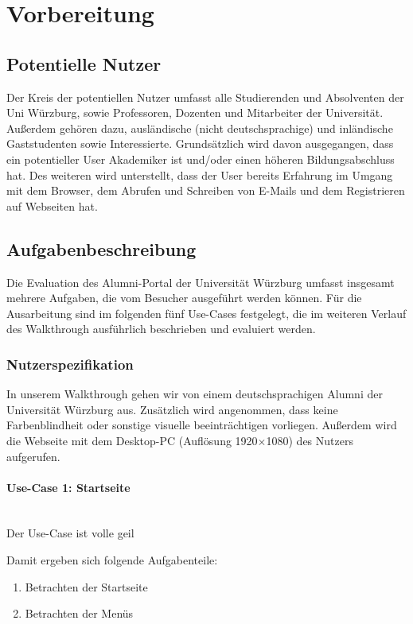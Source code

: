 \section{Vorbereitung}
\subsection{Potentielle Nutzer}
Der Kreis der potentiellen Nutzer umfasst alle Studierenden und Absolventen der Uni Würzburg, sowie Professoren, Dozenten und Mitarbeiter der Universität. Außerdem gehören dazu, ausländische (nicht deutschsprachige) und inländische Gaststudenten sowie Interessierte. Grundsätzlich wird davon ausgegangen, dass ein potentieller User Akademiker ist und/oder einen höheren Bildungsabschluss hat. Des weiteren wird unterstellt, dass der User bereits Erfahrung im Umgang mit dem Browser, dem Abrufen und Schreiben von E-Mails und dem Registrieren auf Webseiten hat. 

\subsection{Aufgabenbeschreibung}
Die Evaluation des Alumni-Portal der Universität Würzburg umfasst insgesamt mehrere Aufgaben, die vom Besucher ausgeführt werden können. Für die Ausarbeitung sind im folgenden fünf Use-Cases festgelegt, die im weiteren Verlauf des Walkthrough ausführlich beschrieben und evaluiert werden. 

\subsubsection*{Nutzerspezifikation}
In unserem Walkthrough gehen wir von einem deutschsprachigen Alumni der Universität Würzburg aus. Zusätzlich wird angenommen, dass keine Farbenblindheit oder sonstige visuelle beeinträchtigen vorliegen. 
Außerdem wird die Webseite mit dem Desktop-PC (Auflösung 1920$\times$1080) des Nutzers aufgerufen. 

\paragraph{Use-Case 1: Startseite}\quad\\
Der Use-Case ist volle geil

Damit ergeben sich folgende Aufgabenteile:
\begin{enumerate}

		\item Betrachten der Startseite
		\item Betrachten der Menüs
\end{enumerate}

